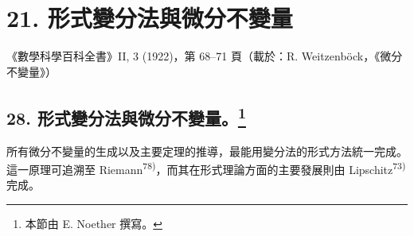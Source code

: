 \documentclass[11pt]{article}
\begin{document}
\setcounter{footnote}{0}

\section*{21. 形式變分法與微分不變量}
\begin{center}
《數學科學百科全書》II, 3 (1922)，第 68--71 頁（載於：R. Weitzenböck，《微分不變量》）
\end{center}

\begingroup
\renewcommand{\thefootnote}{\arabic{footnote})}
\setcounter{footnote}{148}
\subsection*{28. 形式變分法與微分不變量。\footnote{本節由 E. Noether 撰寫。}}

所有微分不變量的生成以及主要定理的推導，最能用變分法的形式方法統一完成。這一原理可追溯至 Riemann\textsuperscript{78)}，而其在形式理論方面的主要發展則由 Lipschitz\textsuperscript{73)} 完成。
\end{document}
